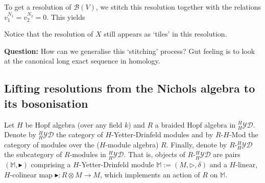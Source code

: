 \documentclass{amsart}
\theoremstyle{definition}
\newcommand{\YD}[1]{\ensuremath{{}^{#1}_{#1}\mathcal{YD}}}
\newcommand{\Nichols}[1]{\ensuremath{\mathcal{B}(#1)}}
\begin{document}
	To get a resolution of $\Nichols V$, we stitch this resolution together with  the relations $v_1^{N_1} = v_2^{N_2} =0$. This yields
	\begin{center}
	\end{center}
	Notice that the resolution of $X$ still appears as `tiles' in this resolution.
	
	\textbf{Question:} How can we generalise this `stitching' process? Gut feeling is to look at the canonical long exact sequence in homology. 
	
	
	\subsection{Lifting resolutions from the Nichols algebra to its bosonisation}
	
	Let $H$ be Hopf algebra (over any field $k$) and $R$ a braided Hopf algebra in $\YD H$. Denote by $\YD{H}$ the category of $H$-Yetter-Drinfeld modules and by $R$-$H$-Mod the category of modules over the ($H$-module algebra) $R$. Finally, denote by 
	$R$-$\YD{H}$ the subcategory of $R$-modules in $\YD{H}$. That is, objects of 
	$R$-$\YD{H}$ are pairs $(\mathbb M,\blacktriangleright)$ comprising a $H$-Yetter-Drinfeld module $\mathbb M := (M,\triangleright,\delta)$ and a $H$-linear, $H$-colinear map $\blacktriangleright: R \otimes M \rightarrow M$, which implements an action of $R$ on $\mathbb M$.
	
\end{document}
